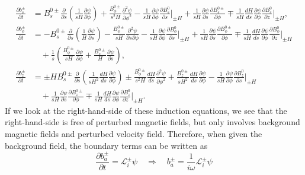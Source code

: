 \begin{equation}
    \begin{aligned}
        \frac{\partial b_s^\pm}{\partial t} &= B_s^{0\pm} \frac{\partial}{\partial s} \left(\frac{1}{sH}\frac{\partial \psi}{\partial \phi}\right) + \frac{B_\phi^{0\pm}}{s^2 H} \frac{\partial^2 \psi}{\partial \phi^2} - \frac{1}{sH} \frac{\partial \psi}{\partial \phi} \frac{\partial B_s^0}{\partial s}\bigg|_{\pm H} + \frac{1}{sH} \frac{\partial \psi}{\partial s} \frac{\partial B_s^{0\pm}}{\partial \phi} \mp \frac{1}{sH} \frac{dH}{ds}\frac{\partial \psi}{\partial \phi} \frac{\partial B_s^0}{\partial z}\bigg|_{\pm H}, \\ 
        \frac{\partial b_\phi^\pm}{\partial t} &= -B_s^{0\pm} \frac{\partial}{\partial s}\left(\frac{1}{H}\frac{\partial \psi}{\partial s}\right) - \frac{B_\phi^{0\pm}}{sH} \frac{\partial^2 \psi}{\partial s \partial \phi} - \frac{1}{sH} \frac{\partial \psi}{\partial \phi} \frac{\partial B_\phi^0}{\partial s}\bigg|_{\pm H} + \frac{1}{sH} \frac{\partial \psi}{\partial s} \frac{\partial B_\phi^{0\pm}}{\partial \phi} \mp \frac{1}{sH} \frac{dH}{ds}\frac{\partial \psi}{\partial \phi} \frac{\partial B_\phi^0}{\partial z}\bigg|_{\pm H} \\
        &\quad + \frac{1}{s}\left(\frac{B_\phi^{0\pm}}{sH}\frac{\partial \psi}{\partial \phi} + \frac{B_s^{0\pm}}{H}\frac{\partial \psi}{\partial s}\right), \\ 
        \frac{\partial b_z^\pm}{\partial t} &= \pm H B_s^{0\pm} \frac{\partial}{\partial s}\left(\frac{1}{sH^2}\frac{dH}{ds}\frac{\partial \psi}{\partial \phi}\right) \pm \frac{B_\phi^{0\pm}}{s^2 H} \frac{dH}{ds} \frac{\partial^2 \psi}{\partial \phi^2} + \frac{B_z^{0\pm}}{sH^2}\frac{dH}{ds}\frac{\partial \psi}{\partial \phi} - \frac{1}{sH}\frac{\partial \psi}{\partial \phi} \frac{\partial B_z^0}{\partial s}\bigg|_{\pm H} \\
        &\quad + \frac{1}{sH} \frac{\partial \psi}{\partial s} \frac{\partial B_z^{0\pm}}{\partial \phi} \mp \frac{1}{sH} \frac{dH}{ds}\frac{\partial \psi}{\partial \phi} \frac{\partial B_z^0}{\partial z}\bigg|_{\pm H}.
    \end{aligned}
\end{equation}
If we look at the right-hand-side of these induction equations, we see that the right-hand-side is free of perturbed magnetic fields, but only involves background magnetic fields and perturbed velocity field. Therefore, when given the background field, the boundary terms can be written as
\[
    \frac{\partial b_a^{\pm}}{\partial t} = \mathcal{L}_i^{\pm} \psi \quad \Longrightarrow \quad b_a^{\pm} = \frac{1}{i\omega} \mathcal{L}_i^\pm \psi
\]
